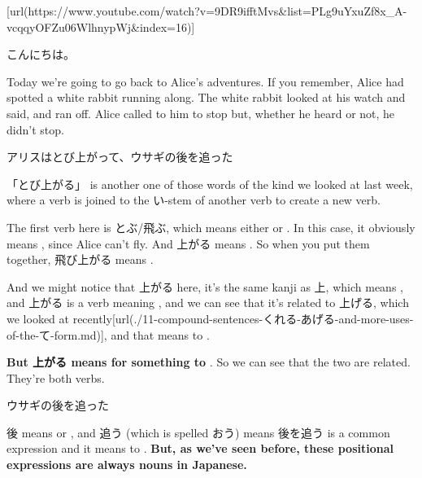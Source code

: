 \startsectionlevel[title={{\bf 14. Adverbs and the も Particle}},reference={adverbs-and-the-も-particle}]

[url(https://www.youtube.com/watch?v=9DR9ifftMvs&list=PLg9uYxuZf8x_A-vcqqyOFZu06WlhnypWj&index=16)]

こんにちは。

Today we're going to go back to Alice's adventures. If you remember, Alice had spotted a white rabbit running along. The white rabbit looked at his watch and said, and ran off. Alice called to him to stop but, whether he heard or not, he didn't stop.

\startblockquote
アリスはとび上がって、ウサギの後を追った
\stopblockquote

「とび上がる」 is another one of those words of the kind we looked at last week, where a verb is joined to the い-stem of another verb to create a new verb.

{}

The first verb here is とぶ/飛ぶ, which means either  or . In this case, it obviously means , since Alice can't fly. And 上がる means . So when you put them together, 飛び上がる means .

{}

And we might notice that 上がる here, it's the same kanji as 上, which means , and 上がる is a verb meaning , and we can see that it's related to 上げる, which we looked at recently\goto{{[}11{]}}[url(./11-compound-sentences-くれる-あげる-and-more-uses-of-the-て-form.md)], and that means to .

{}

{\bf But 上がる means for something to }. So we can see that the two are related. They're both  verbs.

\thinrule

\startblockquote
ウサギの後を追った
\stopblockquote

{}

後 means  or , and 追う (which is spelled おう) means 後を追う is a common expression and it means to . {\bf But, as we've seen before, these positional expressions are always nouns in Japanese.}

